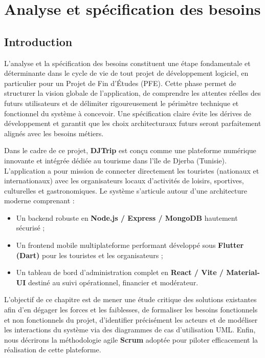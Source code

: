 \documentclass[12pt,a4paper]{report}
\begin{document}
\chapter{Analyse et spécification des besoins}

\section{Introduction}
L’analyse et la spécification des besoins constituent une étape fondamentale et déterminante dans le cycle de vie de tout projet de développement logiciel, en particulier pour un Projet de Fin d’Études (PFE). Cette phase permet de structurer la vision globale de l’application, de comprendre les attentes réelles des futurs utilisateurs et de délimiter rigoureusement le périmètre technique et fonctionnel du système à concevoir. Une spécification claire évite les dérives de développement et garantit que les choix architecturaux futurs seront parfaitement alignés avec les besoins métiers.

Dans le cadre de ce projet, \textbf{DJTrip} est conçu comme une plateforme numérique innovante et intégrée dédiée au tourisme dans l’île de Djerba (Tunisie). L’application a pour mission de connecter directement les touristes (nationaux et internationaux) avec les organisateurs locaux d’activités de loisirs, sportives, culturelles et gastronomiques. Le système s'articule autour d'une architecture moderne comprenant :
\begin{itemize}[label=\textbullet]
    \item Un backend robuste en \textbf{Node.js / Express / MongoDB} hautement sécurisé ;
    \item Un frontend mobile multiplateforme performant développé sous \textbf{Flutter (Dart)} pour les touristes et les organisateurs ;
    \item Un tableau de bord d’administration complet en \textbf{React / Vite / Material-UI} destiné au suivi opérationnel, financier et modérateur.
\end{itemize}

L'objectif de ce chapitre est de mener une étude critique des solutions existantes afin d'en dégager les forces et les faiblesses, de formaliser les besoins fonctionnels et non fonctionnels du projet, d'identifier précisément les acteurs et de modéliser les interactions du système via des diagrammes de cas d'utilisation UML. Enfin, nous décrirons la méthodologie agile \textbf{Scrum} adoptée pour piloter efficacement la réalisation de cette plateforme.
\end{document}
